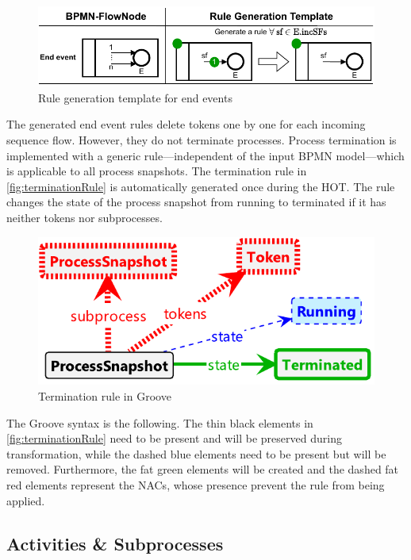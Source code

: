 \documentclass{lmcs} %
\begin{document}
\begin{figure}[ht]
    \centering
    \includegraphics[width=.8\textwidth]{images/end_template.pdf}
    \caption{Rule generation template for end events}
    \label{fig:endTemplate}
\end{figure}
    
The generated end event rules delete tokens one by one for each incoming sequence flow.
However, they do not terminate processes.
Process termination is implemented with a generic rule---independent of the input BPMN model---which is applicable to all process snapshots.
The termination rule in \autoref{fig:terminationRule} is automatically generated once during the HOT.
The rule changes the state of the process snapshot from running to terminated if it has neither tokens nor subprocesses.

\begin{figure}[ht]
    \centering
    \includegraphics[width=.6\textwidth]{images/Terminate.pdf}
    \caption{Termination rule in Groove}
    \label{fig:terminationRule}
\end{figure}

The Groove syntax is the following.
The thin black elements in \autoref{fig:terminationRule} need to be present and will be preserved during transformation, while the dashed blue elements need to be present but will be removed.
Furthermore, the fat green elements will be created and the dashed fat red elements represent the NACs, whose presence prevent the rule from being applied.

\subsection{Activities \& Subprocesses}
\end{document}
